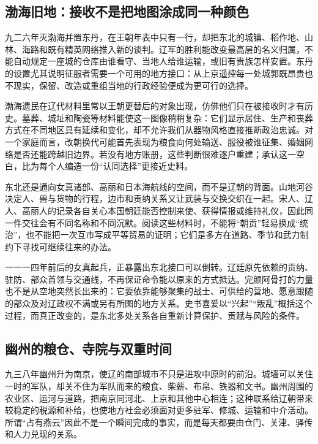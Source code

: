 \subsection{渤海旧地：接收不是把地图涂成同一种颜色}

九二六年灭渤海并置东丹，在王朝年表中只有一行，却把东北的城镇、稻作地、山林、海路和既有精英网络推入新的谈判。辽军的胜利能改变最高层的名义归属，不能自动规定一座城的仓库由谁看守、当地人给谁运输，或旧有贵族怎样安置。东丹的设置尤其说明征服者需要一个可用的地方接口：从上京遥控每一处城郭既昂贵也不现实，保留、改造或重组当地的行政经验便成为更可行的选择。

渤海遗民在辽代材料里常以王朝更替后的对象出现，仿佛他们只在被接收时才有历史。墓葬、城址和陶瓷等材料能使这一图像稍稍复杂：它们显示居住、生产和丧葬方式在不同地区具有延续和变化，却不允许我们从器物风格直接推断政治忠诚。对一个家庭而言，改朝换代可能首先表现为粮食向何处输送、服役被谁征集、婚姻网络是否还能跨越旧边界。若没有地方账册，这些判断很难逐户重建；承认这一空白，比为每个人编造一份“认同选择”更接近史料。

东北还是通向女真诸部、高丽和日本海航线的空间，而不是辽朝的背面。山地河谷决定人、兽与货物的行程，边市和贡纳关系又让武装与交换交织在一起。宋人、辽人、高丽人的记录各自关心本国朝廷能否控制来使、获得情报或维持礼仪，因此同一件交往会有不同名称和不同沉默。阅读这些材料时，不能将“朝贡”轻易换成“统治”，也不能把一次互市写成平等贸易的证明；它们是多方在道路、季节和武力制约下寻找可继续往来的办法。

一一一四年前后的女真起兵，正暴露出东北接口可以倒转。辽廷原先依赖的贡纳、驻防、部众首领与交通线，不再保证命令能以原来的方式抵达。完颜阿骨打的力量也不是从空地突然长出来的：它要依靠能够聚集的战士、可供给的营地、愿意跟随的部众及对辽政权不满或另有所图的地方关系。史书喜爱以“兴起”“叛乱”概括这个过程，而真正改变的，是东北多处关系各自重新计算保护、贡赋与风险的条件。

\subsection{幽州的粮仓、寺院与双重时间}

九三八年幽州升为南京，使辽的南部城市不只是进攻中原时的前沿。城墙可以关住一时的军队，却关不住为军队而来的粮食、柴薪、布帛、铁器和文书。幽州周围的农业区、运河与道路，把南京同河北、上京和其他中心相连；这种联系给辽朝带来较稳定的税源和补给，也使地方社会必须面对更多驻军、修城、运输和中介活动。所谓“占有燕云”因此不是一个瞬间完成的事实，而是每天都要由仓门、关津、驿传和人力兑现的关系。

